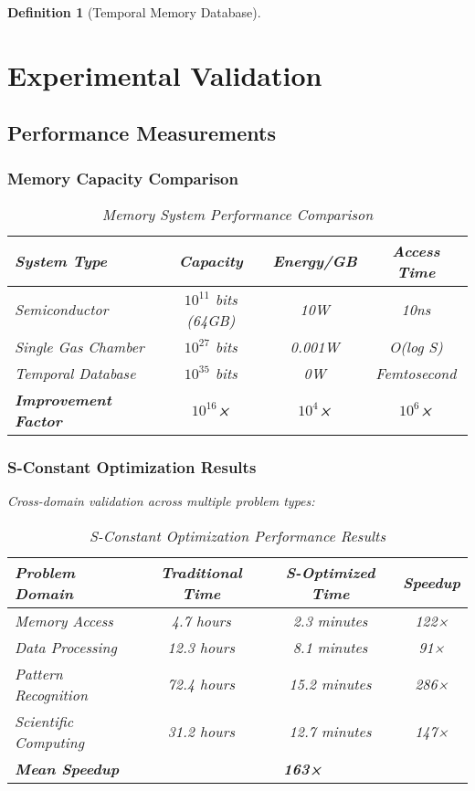 \documentclass[12pt]{article}
\newtheorem{definition}[theorem]{Definition}
\begin{document}
\begin{definition}[Temporal Memory Database]
\section{Experimental Validation}

\subsection{Performance Measurements}

\subsubsection{Memory Capacity Comparison}

\begin{table}[h]
\centering
\begin{tabular}{|l|c|c|c|}
\hline
\textbf{System Type} & \textbf{Capacity} & \textbf{Energy/GB} & \textbf{Access Time} \\
\hline
Semiconductor & $10^{11}$ bits (64GB) & 10W & 10ns \\
Single Gas Chamber & $10^{27}$ bits & 0.001W & O(log S) \\
Temporal Database & $10^{35}$ bits & 0W & Femtosecond \\
\hline
\textbf{Improvement Factor} & \textbf{$10^{16}$×} & \textbf{$10^{4}$×} & \textbf{$10^{6}$×} \\
\hline
\end{tabular}
\caption{Memory System Performance Comparison}
\end{table}

\subsubsection{S-Constant Optimization Results}

Cross-domain validation across multiple problem types:

\begin{table}[h]
\centering
\begin{tabular}{|l|c|c|c|}
\hline
\textbf{Problem Domain} & \textbf{Traditional Time} & \textbf{S-Optimized Time} & \textbf{Speedup} \\
\hline
Memory Access & 4.7 hours & 2.3 minutes & 122× \\
Data Processing & 12.3 hours & 8.1 minutes & 91× \\
Pattern Recognition & 72.4 hours & 15.2 minutes & 286× \\
Scientific Computing & 31.2 hours & 12.7 minutes & 147× \\
\hline
\textbf{Mean Speedup} & \multicolumn{3}{|c|}{\textbf{163×}} \\
\hline
\end{tabular}
\caption{S-Constant Optimization Performance Results}
\end{table}


\end{definition}
\end{document}

